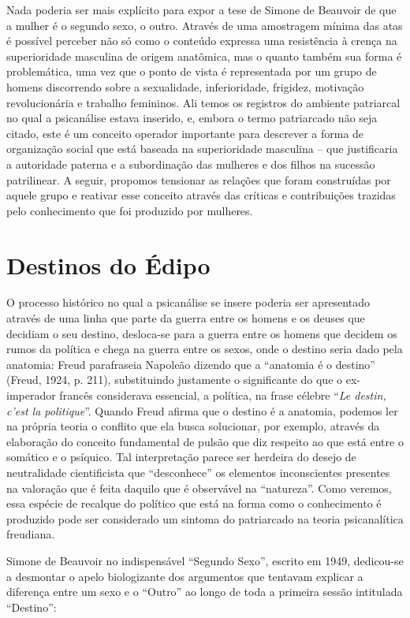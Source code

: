 Nada poderia ser mais explícito para expor a tese de Simone de Beauvoir
de que a mulher é o segundo sexo, o outro. Através de uma amostragem
mínima das atas é possível perceber não só como o conteúdo expressa uma
resistência à crença na superioridade masculina de origem anatômica, mas
o quanto também sua forma é problemática, uma vez que o ponto de vista é
representada por um grupo de homens discorrendo sobre a sexualidade,
inferioridade, frigidez, motivação revolucionária e trabalho femininos.
Ali temos os registros do ambiente patriarcal no qual a psicanálise
estava inserido, e, embora o termo patriarcado não seja citado, este é
um conceito operador importante para descrever a forma de organização
social que está baseada na superioridade masculina -- que justificaria a
autoridade paterna e a subordinação das mulheres e dos filhos na
sucessão patrilinear. A seguir, propomos tensionar as relações que foram
construídas por aquele grupo e reativar esse conceito através das
críticas e contribuições trazidas pelo conhecimento que foi produzido
por mulheres.

\section{Destinos do Édipo}

O processo histórico no qual a psicanálise se insere poderia ser
apresentado através de uma linha que parte da guerra entre os homens e
os deuses que decidiam o seu destino, desloca-se para a guerra entre os
homens que decidem os rumos da política e chega na guerra entre os
sexos, onde o destino seria dado pela anatomia: Freud parafraseia
Napoleão dizendo que a ``anatomia é o destino'' (Freud, 1924, p. 211),
substituindo justamente o significante do que o ex-imperador francês
considerava essencial, a política, na frase célebre ``\emph{Le destin,
c'est la politique}''. Quando Freud afirma que o destino é a anatomia,
podemos ler na própria teoria o conflito que ela busca solucionar, por
exemplo, através da elaboração do conceito fundamental de pulsão que diz
respeito ao que está entre o somático e o psíquico. Tal interpretação
parece ser herdeira do desejo de neutralidade cientificista que
``desconhece'' os elementos inconscientes presentes na valoração que é
feita daquilo que é observável na ``natureza''. Como veremos, essa
espécie de recalque do político que está na forma como o conhecimento é
produzido pode ser considerado um sintoma do patriarcado na teoria
psicanalítica freudiana.

Simone de Beauvoir no indispensável ``Segundo Sexo'', escrito em 1949,
dedicou-se a desmontar o apelo biologizante dos argumentos que tentavam
explicar a diferença entre um sexo e o ``Outro'' ao longo de toda a
primeira sessão intitulada ``Destino'':

